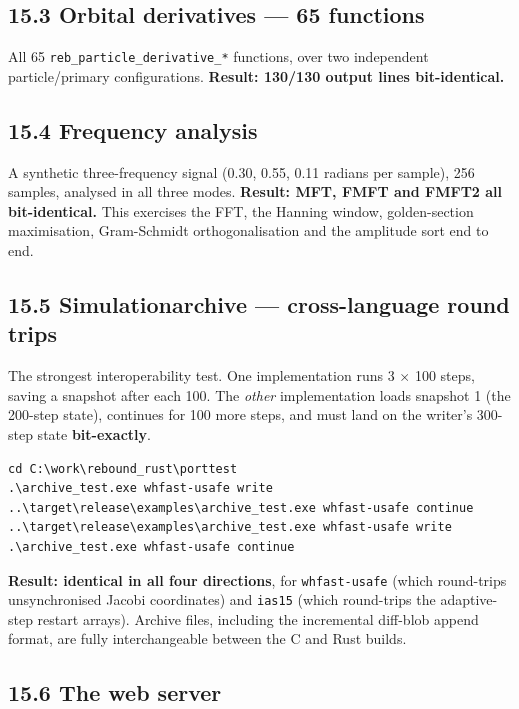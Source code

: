 \documentclass[11pt]{article}
\begin{document}
\subsection{15.3 Orbital derivatives --- 65 functions}

All 65 \texttt{reb\_particle\_derivative\_*} functions, over two independent particle/primary configurations. \textbf{Result: 130/130 output lines bit-identical.}

\subsection{15.4 Frequency analysis}

A synthetic three-frequency signal (0.30, 0.55, 0.11 radians per sample), 256 samples, analysed in all three modes. \textbf{Result: MFT, FMFT and FMFT2 all bit-identical.} This exercises the FFT, the Hanning window, golden-section maximisation, Gram-Schmidt orthogonalisation and the amplitude sort end to end.

\subsection{15.5 Simulationarchive --- cross-language round trips}

The strongest interoperability test. One implementation runs 3 \(\times\) 100 steps, saving a snapshot after each 100. The \emph{other} implementation loads snapshot 1 (the 200-step state), continues for 100 more steps, and must land on the writer's 300-step state \textbf{bit-exactly}.

\begin{lstlisting}
cd C:\work\rebound_rust\porttest
.\archive_test.exe whfast-usafe write
..\target\release\examples\archive_test.exe whfast-usafe continue
..\target\release\examples\archive_test.exe whfast-usafe write
.\archive_test.exe whfast-usafe continue
\end{lstlisting}

\textbf{Result: identical in all four directions}, for \texttt{whfast-usafe} (which round-trips unsynchronised Jacobi coordinates) and \texttt{ias15} (which round-trips the adaptive-step restart arrays). Archive files, including the incremental diff-blob append format, are fully interchangeable between the C and Rust builds.

\subsection{15.6 The web server}
\end{document}
